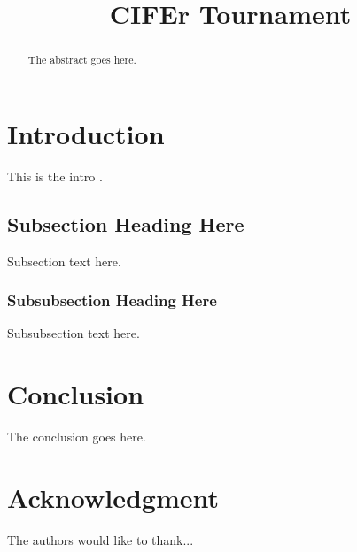 \documentclass[conference, draftcls]{IEEEtran}
\begin{document}
\title{CIFEr Tournament}

\author{
  \and
}


\maketitle

\begin{abstract}
The abstract goes here.
\end{abstract}

\IEEEpeerreviewmaketitle

\section{Introduction}
This is the intro \cite{IEEEhowto:IEEEtranpage}.

\subsection{Subsection Heading Here}
Subsection text here.

\subsubsection{Subsubsection Heading Here}
Subsubsection text here.

\section{Conclusion}
The conclusion goes here.

\section*{Acknowledgment}
The authors would like to thank...



\end{document}

